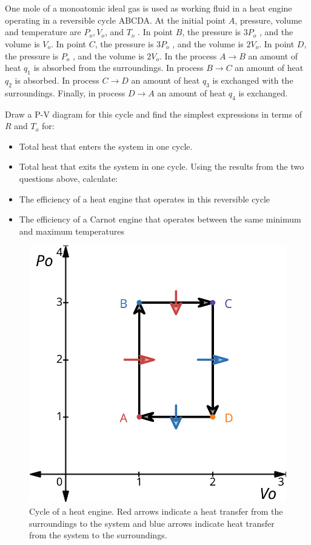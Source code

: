 \documentclass[main.tex]{subfiles}
\begin{document}

\subsection{~}
One mole of a monoatomic ideal gas is used as working fluid in a heat engine operating in a
reversible cycle ABCDA. 
At the initial point $A$, pressure, volume and temperature are $P_o , V_o $, and $T_o$ .
In point $B$, the pressure is $3P_o$ , and the volume is $V_o$. 
In point $C$, the pressure is $3P_o$ , and the volume is $2V_o$.
In point $D$, the pressure is $P_o$ , and the volume is $2V_o$.
In the process $A\to B$ an amount of heat $q_{1}$ is absorbed from the surroundings.
In process $B\to C$ an amount of heat $q_2$ is absorbed.
In process $C\to D$ an amount of heat $q_3$ is exchanged with the surroundings.
Finally, in process $D\to A$ an amount of heat $q_4$ is exchanged.

Draw a P-V diagram for this cycle and find the simplest expressions in terms of $R$ and $T_o$ for:
\begin{itemize}
    \item Total heat that enters the system in one cycle.
    \item Total heat that exits the system in one cycle.
 Using the results from the two questions above, calculate:   
    \item The efficiency of a heat engine that operates in this reversible cycle
    \item The efficiency of a Carnot engine that operates between the same minimum and maximum
temperatures
\end{itemize}

\begin{figure}[ht!]
    \centering
    \includegraphics[width=0.45\linewidth]{imgs/hw2/cycle.png}
    \caption{Cycle of a heat engine. Red arrows indicate a heat transfer from the surroundings to the system and blue arrows indicate heat transfer from the system to the surroundings.}
\end{figure}
\end{document}
